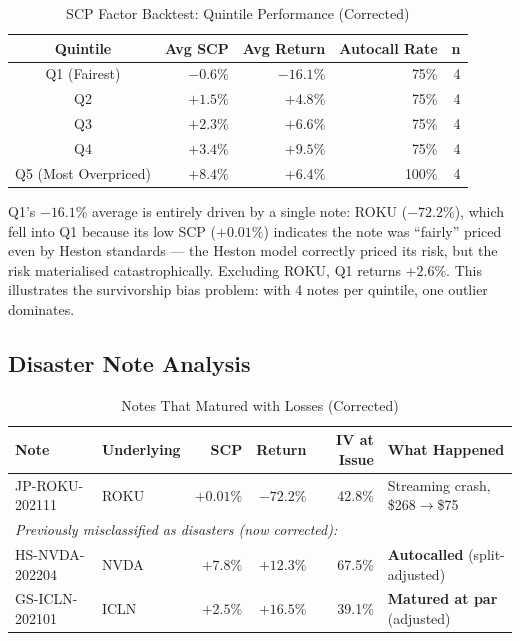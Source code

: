 \documentclass[10pt,a4paper]{article}
\begin{document}
\begin{table}[H]\centering\small
\caption{SCP Factor Backtest: Quintile Performance (Corrected)}
\begin{tabular}{@{}crrrr@{}}\toprule
\textbf{Quintile}&\textbf{Avg SCP}&\textbf{Avg Return}&\textbf{Autocall Rate}&\textbf{n}\\\midrule
Q1 (Fairest)&$-0.6\%$&$-16.1\%$&75\%&4\\
Q2&$+1.5\%$&$+4.8\%$&75\%&4\\
Q3&$+2.3\%$&$+6.6\%$&75\%&4\\
Q4&$+3.4\%$&$+9.5\%$&75\%&4\\
Q5 (Most Overpriced)&$+8.4\%$&$+6.4\%$&100\%&4\\
\bottomrule
\end{tabular}\end{table}

Q1's $-16.1\%$ average is entirely driven by a single note: ROKU ($-72.2\%$), which fell into Q1 because its low SCP ($+0.01\%$) indicates the note was ``fairly'' priced even by Heston standards --- the Heston model correctly priced its risk, but the risk materialised catastrophically. Excluding ROKU, Q1 returns $+2.6\%$. This illustrates the survivorship bias problem: with 4 notes per quintile, one outlier dominates.

\subsection{Disaster Note Analysis}

\begin{table}[H]\centering\small
\caption{Notes That Matured with Losses (Corrected)}
\begin{tabular}{@{}llrrrl@{}}\toprule
\textbf{Note}&\textbf{Underlying}&\textbf{SCP}&\textbf{Return}&\textbf{IV at Issue}&\textbf{What Happened}\\\midrule
JP-ROKU-202111&ROKU&$+0.01\%$&$-72.2\%$&42.8\%&Streaming crash, \$268$\to$\$75\\
\midrule
\multicolumn{5}{l}{\textit{Previously misclassified as disasters (now corrected):}}&\\
HS-NVDA-202204&NVDA&$+7.8\%$&$+12.3\%$&67.5\%&\textbf{Autocalled} (split-adjusted)\\
GS-ICLN-202101&ICLN&$+2.5\%$&$+16.5\%$&39.1\%&\textbf{Matured at par} (adjusted)\\
\bottomrule
\end{tabular}\end{table}
\end{document}
